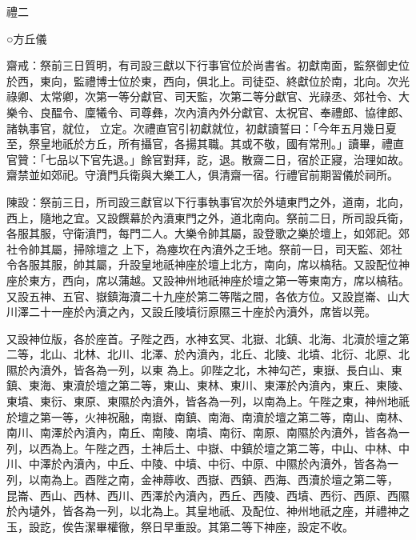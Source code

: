 
\begin{pinyinscope}

 禮二



 ○方丘儀



 齋戒：祭前三日質明，有司設三獻以下行事官位於尚書省。初獻南面，監祭御史位於西，東向，監禮博士位於東，西向，俱北上。司徒亞、終獻位於南，北向。次光祿卿、太常卿，次第一等分獻官、司天監，次第二等分獻官、光祿丞、郊社令、大樂令、良醖令、廩犧令、司尊彝，次內濆內外分獻官、太祝官、奉禮郎、協律郎、諸執事官，就位，
 立定。次禮直官引初獻就位，初獻讀誓曰：「今年五月幾日夏至，祭皇地祇於方丘，所有攝官，各揚其職。其或不敬，國有常刑。」讀畢，禮直官贊：「七品以下官先退。」餘官對拜，訖，退。散齋二日，宿於正寢，治理如故。齋禁並如郊祀。守濆門兵衛與大樂工人，俱清齋一宿。行禮官前期習儀於祠所。



 陳設：祭前三日，所司設三獻官以下行事執事官次於外壝東門之外，道南，北向，西上，隨地之宜。又設饌幕於內濆東門之外，道北南向。祭前二日，所司設兵衛，各服其服，守衛濆門，每門二人。大樂令帥其屬，設登歌之樂於壇上，如郊祀。郊社令帥其屬，掃除壇之
 上下，為瘞坎在內濆外之壬地。祭前一日，司天監、郊社令各服其服，帥其屬，升設皇地祇神座於壇上北方，南向，席以槁秸。又設配位神座於東方，西向，席以蒲越。又設神州地祇神座於壇之第一等東南方，席以槁秸。又設五神、五官、嶽鎮海瀆二十九座於第二等階之間，各依方位。又設崑崙、山大川澤二十一座於內濆之內，又設丘陵墳衍原隰三十座於內濆外，席皆以莞。



 又設神位版，各於座首。子陛之西，水神玄冥、北嶽、北鎮、北海、北瀆於壇之第二等，北山、北林、北川、北澤、於內濆內，北丘、北陵、北墳、北衍、北原、北隰於內濆外，皆各為一列，以東
 為上。卯陛之北，木神勾芒，東嶽、長白山、東鎮、東海、東瀆於壇之第二等，東山、東林、東川、東澤於內濆內，東丘、東陵、東墳、東衍、東原、東隰於內濆外，皆各為一列，以南為上。午陛之東，神州地祇於壇之第一等，火神祝融，南嶽、南鎮、南海、南瀆於壇之第二等，南山、南林、南川、南澤於內濆內，南丘、南陵、南墳、南衍、南原、南隰於內濆外，皆各為一列，以西為上。午陛之西，土神后土、中嶽、中鎮於壇之第二等，中山、中林、中川、中澤於內濆內，中丘、中陵、中墳、中衍、中原、中隰於內濆外，皆各為一列，以南為上。酉陛之南，金神蓐收、西嶽、西鎮、西海、西瀆於壇之第二等，
 昆崙、西山、西林、西川、西澤於內濆內，西丘、西陵、西墳、西衍、西原、西隰於內壝外，皆各為一列，以北為上。其皇地祇、及配位、神州地祇之座，并禮神之玉，設訖，俟告潔畢權徹，祭日早重設。其第二等下神座，設定不收。




\end{pinyinscope}
